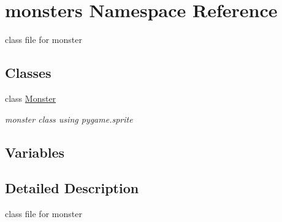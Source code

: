 \hypertarget{namespacemonsters}{}\section{monsters Namespace Reference}
\label{namespacemonsters}


class file for monster  


\subsection*{Classes}
\begin{DoxyCompactItemize}
\item 
class \hyperlink{classmonsters_1_1_monster}{Monster}
\begin{DoxyCompactList}\small\item\em monster class using pygame.\+sprite \end{DoxyCompactList}\end{DoxyCompactItemize}
\subsection*{Variables}
\begin{DoxyCompactItemize}
\end{DoxyCompactItemize}


\subsection{Detailed Description}
class file for monster 